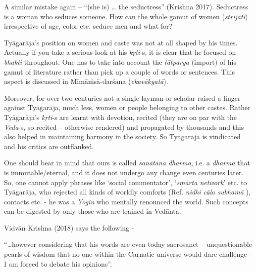 A similar mistake again – “(she is) … the seductress” (Krishna 2017). Seductress is a woman who seduces someone. How can the whole gamut of women (\textit{strījāti}) irrespective of age, color etc. seduce men and what for? 

Tyāgarāja’s position on women and caste was not at all shaped by his times. Actually if you take a serious look at his \textit{kṛti}-s, it is clear that he focused on \textit{bhakti} throughout. One has to take into account the \textit{tātparya} (import) of his gamut of literature rather than pick up a couple of words or sentences. This aspect is discussed in Mīmāṁsā-darśana (\textit{ekavākyatā}). 

Moreover, for over two centuries not a single layman or scholar raised a finger against Tyāgarāja, much less, women or people belonging to other castes. Rather Tyāgarāja’s \textit{kṛti}-s are learnt with devotion, recited (they are on par with the \textit{Veda}-s, so recited – otherwise rendered) and propagated by thousands and this also helped in maintaining harmony in the society. So Tyāgarāja is vindicated and his critics are outflanked. 

One should bear in mind that ours is called \textit{sanātana dharma}, i.e. a \textit{dharma} that is immutable/eternal, and it does not undergo any change even centuries later. So, one cannot apply phrases like ‘social commentator’, ‘\textit{smārta network}’ etc. to Tyāgarāja, who rejected all kinds of worldly comforts (Ref. \textit{nidhi cāla sukhamā} ), contacts etc. - he was a \textit{Yogin} who mentally renounced the world. Such concepts can be digested by only those who are trained in Vedānta.

Vidvān Krishna (2018) says the following -

\begin{myquote}
“…however considering that his words are even today sacrosanct – unquestionable pearls of wisdom that no one within the Carnatic universe would dare challenge - I am forced to debate his opinions”.
\end{myquote}


